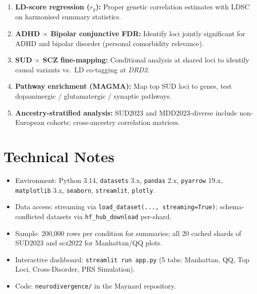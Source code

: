 \documentclass[11pt, a4paper]{article}
\begin{document}
\begin{enumerate}[leftmargin=1.8em]
  \item \textbf{LD-score regression ($r_g$):} Proper genetic correlation estimates
        with LDSC on harmonised summary statistics.
  \item \textbf{ADHD $\times$ Bipolar conjunctive FDR:} Identify loci jointly
        significant for ADHD and bipolar disorder (personal comorbidity relevance).
  \item \textbf{SUD $\times$ SCZ fine-mapping:} Conditional analysis at shared loci
        to identify causal variants vs.\ LD co-tagging at \textit{DRD2}.
  \item \textbf{Pathway enrichment (MAGMA):} Map top SUD loci to genes,
        test dopaminergic / glutamatergic / synaptic pathways.
  \item \textbf{Ancestry-stratified analysis:} SUD2023 and MDD2023-diverse include
        non-European cohorts; cross-ancestry correlation matrices.
\end{enumerate}

\section*{Technical Notes}

\begin{itemize}
  \item Environment: Python 3.14, \texttt{datasets} 3.x, \texttt{pandas} 2.x,
        \texttt{pyarrow} 19.x, \texttt{matplotlib} 3.x, \texttt{seaborn},
        \texttt{streamlit}, \texttt{plotly}.
  \item Data access: streaming via \texttt{load\_dataset(..., streaming=True)};
        schema-conflicted datasets via \texttt{hf\_hub\_download} per-shard.
  \item Sample: 200,000 rows per condition for summaries; all 20 cached shards
        of SUD2023 and scz2022 for Manhattan/QQ plots.
  \item Interactive dashboard: \texttt{streamlit run app.py} (5 tabs: Manhattan,
        QQ, Top Loci, Cross-Disorder, PRS Simulation).
  \item Code: \texttt{neurodivergence/} in the Maynard repository.
\end{itemize}

\end{document}
